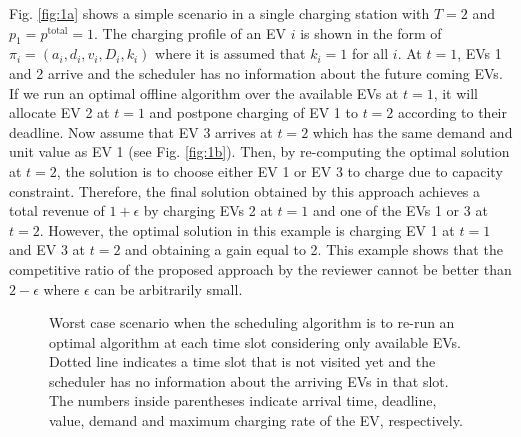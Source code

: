 \documentclass[11pt]{article}
\begin{document}
Fig. \ref{fig:1a} shows a simple scenario in a single charging station with $T=2$ and $p_1=p^{\text{total}}=1$. The charging profile of an EV $i$ is shown in the form of $\pi_i=(a_i,d_i,v_i,D_i,k_i)$ where it is assumed that $k_i=1$ for all $i$.
At $t=1$, EVs 1 and 2 arrive and the scheduler has no information about the future coming EVs. If we run an optimal offline algorithm over the available EVs at $t=1$, it will allocate EV 2 at $t=1$ and postpone charging of EV 1 to $t=2$ according to their deadline. Now assume that EV 3 arrives at $t=2$ which has the same demand and unit value as EV 1 (see Fig. \ref{fig:1b}). Then, by re-computing the optimal solution at $t=2$, the solution is to choose either EV 1 or EV 3 to charge due to capacity constraint. Therefore, the final solution obtained by this approach achieves a total revenue of $1+\epsilon$ by charging EVs 2 at $t=1$ and one of the EVs 1 or 3 at $t=2$. However, the optimal solution in this example is charging EV 1 at $t=1$ and EV 3 at $t=2$ and obtaining a gain equal to 2. This example shows that the competitive ratio of the proposed approach by the reviewer cannot be better than $2-\epsilon$ where $\epsilon$ can be arbitrarily small.  

\begin{figure}
\centering     %
		\hspace{8mm}
\caption{Worst case scenario when the scheduling algorithm is to re-run an optimal algorithm at each time slot considering only available EVs. Dotted line indicates a time slot that is not visited yet and the scheduler has no information about the arriving EVs in that slot. The numbers inside parentheses indicate arrival time, deadline, value, demand and maximum charging rate of the EV, respectively.}
\label{fig:1}
\end{figure}
\end{document}
